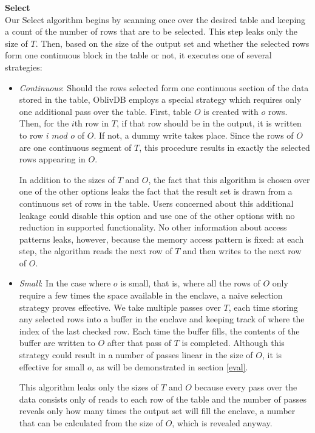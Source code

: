 \documentclass[conference]{IEEEtran}
\def\name/{OblivDB}
\begin{document}
\medskip \noindent \textbf{Select}\\
Our Select algorithm begins by scanning once over the desired table and keeping a count of the number of rows that are to be selected. This step leaks only the size of $T$. Then, based on the size of the output set and whether the selected rows form one continuous block in the table or not, it executes one of several strategies:
\begin{itemize}
\item \textit{Continuous}: Should the rows selected form one continuous section of the data stored in the table, \name/ employs a special strategy which requires only one additional pass over the table. First, table $O$ is created with $o$ rows. Then, for the $i$th row in $T$, if that row should be in the output, it is written to row $i\textit{ mod }o$ of $O$. If not, a dummy write takes place. Since the rows of $O$ are one continuous segment of $T$, this procedure results in exactly the selected rows appearing in $O$. 

In addition to the sizes of $T$ and $O$, the fact that this algorithm is chosen over one of the other options leaks the fact that the result set is drawn from a continuous set of rows in the table. Users concerned about this additional leakage could disable this option and use one of the other options with no reduction in supported functionality. No other information about access patterns leaks, however, because the memory access pattern is fixed: at each step, the algorithm reads the next row of $T$ and then writes to the next row of $O$. 

\item \textit{Small}: In the case where $o$ is small, that is, where all the rows of $O$ only require a few times the space available in the enclave, a naive selection strategy proves effective. We take multiple passes over $T$, each time storing any selected rows into a buffer in the enclave and keeping track of where the index of the last checked row. Each time the buffer fills, the contents of the buffer are written to $O$ after that pass of $T$ is completed. Although this strategy could result in a number of passes linear in the size of $O$, it is effective for small $o$, as will be demonstrated in section \ref{eval}.

This algorithm leaks only the sizes of $T$ and $O$ because every pass over the data consists only of reads to each row of the table and the number of passes reveals only how many times the output set will fill the enclave, a number that can be calculated from the size of $O$, which is revealed anyway. 


\end{itemize}
\end{document}
